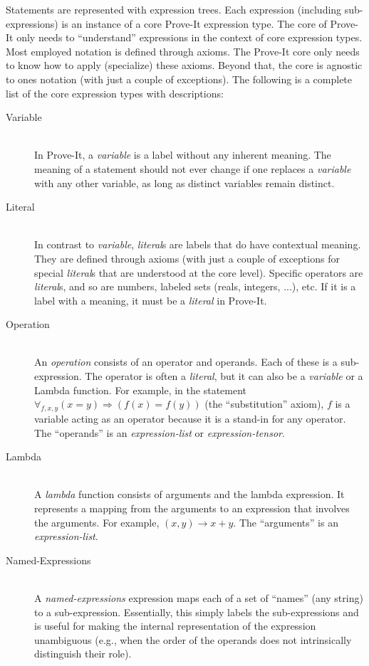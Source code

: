 \documentclass{article}[12pt]
\begin{document}
Statements are represented with expression trees.  Each expression (including sub-expressions) is an instance of a core Prove-It expression type.  The core of Prove-It only needs to “understand” expressions in the context of core expression types.  Most employed notation is defined through axioms.  The Prove-It core only needs to know how to apply (specialize) these axioms.  Beyond that, the core is agnostic to ones notation (with just a couple of exceptions).  The following is a complete list of the core expression types with descriptions:
\begin{description}
\item[Variable] \hfill \\
  In Prove-It, a {\em variable} is a label without any inherent meaning.  The meaning of a statement should not ever change if one replaces a {\em variable} with any other variable, as long as distinct variables remain distinct.
\item[Literal] \hfill \\
  In contrast to {\em variable}, {\em literal}s are labels that do have contextual meaning.  They are defined through axioms (with just a couple of exceptions for special {\em literal}s that are understood at the core level).  Specific operators are {\em literal}s, and so are numbers, labeled sets (reals, integers, ...), etc.  If it is a label with a meaning, it must be a {\em literal} in Prove-It.
\item[Operation] \hfill \\
  An {\em operation} consists of an operator and operands.  Each of these is a sub-expression.  The operator is often a {\em literal}, but it can also be a {\em variable} or a Lambda function.  For example, in the statement
  $\forall_{f, x, y} (x = y) \Rightarrow (f(x) = f(y))$ (the “substitution” axiom), $f$ is a variable acting as an operator because it is a stand-in for any operator.  The “operands” is an {\em expression-list} or {\em expression-tensor}.
\item[Lambda] \hfill \\
  A {\em lambda} function consists of arguments and the lambda expression.  It represents a mapping from the arguments to an expression that involves the arguments.  For example, $(x,y) \rightarrow x+y$.  The “arguments” is an {\em expression-list}.
\item[Named-Expressions] \hfill \\
  A {\em named-expressions} expression maps each of a set of “names” (any string) to a sub-expression.  Essentially, this simply labels the sub-expressions and is useful for making the internal representation of the expression unambiguous (e.g., when the order of the operands does not intrinsically distinguish their role).

\end{description}
\end{document}
